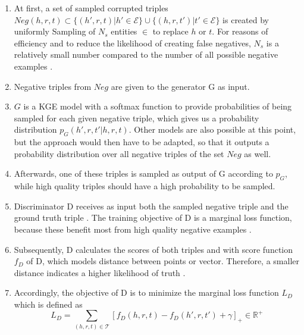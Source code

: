 \begin{enumerate}
    \item 
    At first, a set of sampled corrupted triples $Neg(h,r,t)\subset\{(h',r,t)|h'\in\mathcal{E}\}\cup\{(h,r,t')|t'\in\mathcal{E}\}$ is created by uniformly Sampling of $N_s$ entities $\in$ \entities to replace $h$ or $t$.
    For reasons of efficiency and to reduce the likelihood of creating false negatives, $N_s$ is a relatively small number compared to the number of all possible negative examples \cite{cai2017kbgan}.
    
    \item 
    Negative triples from $Neg$ are given to the generator G as input.
    
    \item 
    $G$ is a \ac{KGE} model with a softmax function to provide  probabilities of being sampled for each given negative triple, which gives us a probability distribution $p_G(h',r,t'|h,r,t)$.
    Other models are also possible at this point, but the approach would then have to be adapted, so that it outputs a probability distribution over all negative triples of the set $Neg$ as well.

    \item 
    Afterwards, one of these triples is sampled as output of G according to $p_G$, while high quality triples should have a high probability to be sampled.
    
    \item 
    Discriminator D receives as input both the sampled negative triple  and the ground truth triple .
    The training objective of D is a marginal loss function, because these benefit most from high quality negative examples \cite{cai2017kbgan}.

    \item 
    Subsequently, D calculates the scores of both triples  and  with score function $f_D$ of D, which models distance between points or vector.
    Therefore, a smaller distance indicates a higher likelihood of truth \cite{cai2017kbgan}.
    
    \item 
    Accordingly, the objective of D is to minimize the marginal loss function $L_D$ which is defined as
    \begin{equation}
        L_D=\sum_{(h,r,t)\in\mathcal{T}}[f_D(h,r,t)-f_D(h',r,t')+\gamma]_+ \in \mathbb{R}^+
    \end{equation}
    

\end{enumerate}
